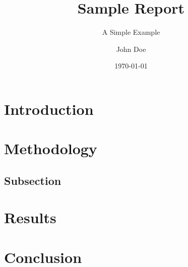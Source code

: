 \documentclass{report}
\title{Sample Report}
\subtitle{A Simple Example}
\author{John Doe}
\date{\today}
\begin{document}
\maketitle

\section{Introduction}

\lipsum[1-2] %

\section{Methodology}

\lipsum[3-4] %

\subsection{Subsection}

\lipsum[5] %

\section{Results}

\lipsum[6-7] %

\section{Conclusion}

\lipsum[8-9] %
\end{document}
